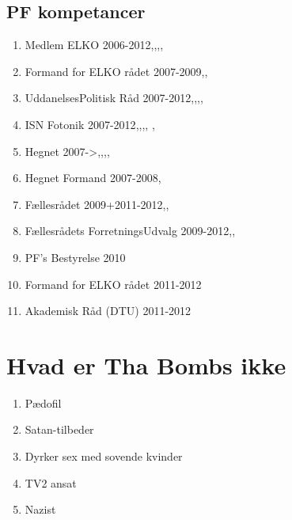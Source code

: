 \subsection{PF kompetancer}
\begin{enumerate}
\item Medlem ELKO 2006-2012\cite{bib:url:Beret2007},\cite{bib:url:Beret2008},\cite{bib:url:Beret2009},\cite{bib:url:Beret2010},\cite{bib:url:Beret2011}
\item Formand for ELKO rådet 2007-2009\cite{bib:url:Beret2007},\cite{bib:url:Beret2008},\cite{bib:url:Beret2009}
\item UddanelsesPolitisk Råd 2007-2012\cite{bib:url:Beret2007},\cite{bib:url:Beret2008},\cite{bib:url:Beret2009},\cite{bib:url:Beret2010},\cite{bib:url:Beret2011}
\item ISN Fotonik 2007-2012\cite{bib:url:Beret2007},\cite{bib:url:Beret2008},\cite{bib:url:Beret2009},\cite{bib:url:Beret2010},\cite{bib:url:Beret2011} , \cite{bib:url:ISNfoto}
\item Hegnet 2007->\cite{bib:url:Beret2007},\cite{bib:url:Beret2008},\cite{bib:url:Beret2009},\cite{bib:url:Beret2010},\cite{bib:url:Beret2011}
\item Hegnet Formand 2007-2008\cite{bib:url:Beret2007},\cite{bib:url:Beret2008}
\item Fællesrådet 2009+2011-2012\cite{bib:url:Beret2009},\cite{bib:url:Beret2010},\cite{bib:url:Beret2011}
\item Fællesrådets ForretningsUdvalg 2009-2012\cite{bib:url:Beret2009},\cite{bib:url:Beret2010},\cite{bib:url:Beret2011}
\item PF's Bestyrelse 2010\cite{bib:url:Beret2010}
\item Formand for ELKO rådet 2011-2012 \cite{bib:url:Beret2011}
\item Akademisk Råd (DTU) 2011-2012\cite{bib:url:Beret2011}
\end{enumerate}

\section{Hvad er Tha Bombs ikke}
\begin{enumerate}
\item Pædofil \cite{bib:url:Finn:Pedo}
\item Satan-tilbeder \cite{bib:url:Finn:Satan}
\item Dyrker sex med sovende kvinder \cite{bib:url:Finn:SovendeKvinder}
\item TV2 ansat \cite{bib:url:Finn:TV2}
\item Nazist\cite{bib:url:Finn:Nazist}
\end{enumerate}



